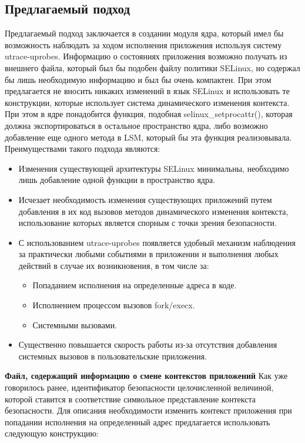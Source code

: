 
\bigskip
\subsection{Предлагаемый подход}

Предлагаемый подход заключается в создании 
модуля ядра, который имел бы возможность наблюдать
за ходом исполнения приложения используя систему 
utrace-uprobes. Информацию о состояниях приложения
возможно получать из внешнего файла, который был 
бы подобен файлу политики SELinux, но содержал бы
лишь необходимую информацию и был бы очень компактен. 
При этом предлагается не вносить никаких изменений 
в язык SELinux и использовать те конструкции, которые 
использует система динамического изменения контекста. 
При этом в ядре понадобится функция, подобная 
selinux\_setprocattr(), которая должна экспортироваться
в остальное пространство ядра, либо возможно добавление
еще одного метода в LSM, который бы эта функция 
реализовывала. Преимуществами такого подхода являются: 

\bigskip
\begin{itemize}
\item Изменения существующей архитектуры SELinux минимальны, 
необходимо лишь добавление одной функции в пространство ядра. 
\item Исчезает необходимость изменения существующих приложений
путем добавления в их код вызовов методов динамического 
изменения контекста, использование которых является спорным
с точки зрения безопасности. 
\item С использованием utrace-uprobes появляется удобный
механизм наблюдения за практически любыми событиями в 
приложении и выполнения любых действий в случае их 
возникновения, в том числе за:
	\begin{itemize}
	\item Попаданием исполнения на определенные 
	адреса в коде. 
	\item Исполнением процессом вызовов fork/execx.
	\item Системными вызовами. 
	\end{itemize}
\item Существенно повышается скорость работы из-за 
отсутствия добавления системных вызовов в пользовательские 
приложения. 
\end{itemize}

\bigskip
{\bfseries Файл, содержащий информацию о смене контекстов
приложений } 
Как уже говорилось ранее, идентификатор безопасности 
целочисленной величиной, которой ставится в соответствие 
символьное представление контекста безопасности. Для 
описания необходимости изменить контекст приложения 
при попадании исполнения на определенный адрес предлагается 
использовать следующую конструкцию: 

